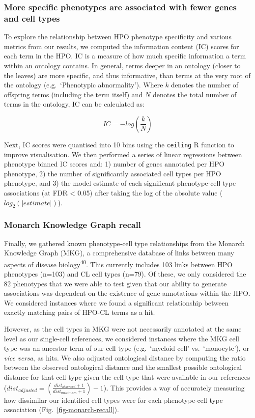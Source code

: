 \documentclass[
]{article}
\begin{document}
\subsubsection{More specific phenotypes are associated with fewer genes
and cell
types}\label{more-specific-phenotypes-are-associated-with-fewer-genes-and-cell-types-1}

To explore the relationship between HPO phenotype specificity and
various metrics from our results, we computed the information content
(IC) scores for each term in the HPO. IC is a measure of how much
specific information a term within an ontology contains. In general,
terms deeper in an ontology (closer to the leaves) are more specific,
and thus informative, than terms at the very root of the ontology
(e.g.~`Phenotypic abnormality'). Where \(k\) denotes the number of
offspring terms (including the term itself) and \(N\) denotes the total
number of terms in the ontology, IC can be calculated as:

\[
IC=-log(\frac{k}{N})
\]

Next, IC scores were quantised into 10 bins using the \texttt{ceiling} R
function to improve visualisation. We then performed a series of linear
regressions between phenotype binned IC scores and: 1) number of genes
annotated per HPO phenotype, 2) the number of significantly associated
cell types per HPO phenotype, and 3) the model estimate of each
significant phenotype-cell type associations (at FDR \textless{} 0.05)
after taking the log of the absolute value (\(log_2(|estimate|)\)).

\subsubsection{Monarch Knowledge Graph
recall}\label{monarch-knowledge-graph-recall}

Finally, we gathered known phenotype-cell type relationships from the
Monarch Knowledge Graph (MKG), a comprehensive database of links between
many aspects of disease biology\textsuperscript{40}. This currently
includes 103 links between HPO phenotypes (n=103) and CL cell types
(n=79). Of these, we only considered the 82 phenotypes that we were able
to test given that our ability to generate associations was dependent on
the existence of gene annotations within the HPO. We considered
instances where we found a significant relationship between exactly
matching pairs of HPO-CL terms as a hit.

However, as the cell types in MKG were not necessarily annotated at the
same level as our single-cell references, we considered instances where
the MKG cell type was an ancestor term of our cell type (e.g.~`myeloid
cell' vs.~`monocyte'), or \emph{vice versa}, as hits. We also adjusted
ontological distance by computing the ratio between the observed
ontological distance and the smallest possible ontological distance for
that cell type given the cell type that were available in our references
(\(dist_{adjusted}=(\frac{dist_{observed}+1}{dist_{minimum}+1})-1\)).
This provides a way of accurately measuring how dissimilar our
identified cell types were for each phenotype-cell type association
(Fig.~\ref{fig-monarch-recall}).
\end{document}
